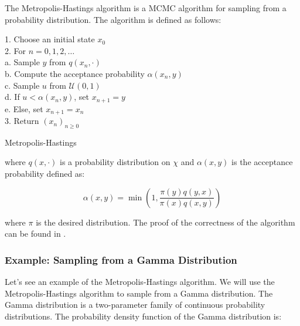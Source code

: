 \documentclass{report}
\begin{document}
The Metropolis-Hastings algorithm is a MCMC algorithm for sampling from a probability distribution. The algorithm is defined as follows:

\begin{center}
	\begin{minipage}{0.7\linewidth} %
		\begin{algorithm}[H]
			1. Choose an initial state $x_0$ \\
			2. For $n = 0, 1, 2, \dots$ \\
			\hspace*{0.5cm} a. Sample $y$ from $q(x_n, \cdot)$ \\
			\hspace*{0.5cm} b. Compute the acceptance probability $\alpha(x_n, y)$ \\
			\hspace*{0.5cm} c. Sample $u$ from $\mathcal{U}(0,1)$ \\
			\hspace*{0.5cm} d. If $u < \alpha(x_n, y)$, set $x_{n+1} = y$ \\
			\hspace*{0.5cm} e. Else, set $x_{n+1} = x_n$ \\
			3. Return $(x_n)_{n \geq 0}$
			\caption{Metropolis-Hastings} %
			\label{alg:Metropolis-Hastings}   %
		\end{algorithm}
	\end{minipage}
\end{center}

where $q(x, \cdot)$ is a probability distribution on $\chi$ and $\alpha(x,y)$ is the acceptance probability defined as:

\[
	\alpha(x,y) = \min \left(1, \frac{\pi(y) q(y,x)}{\pi(x) q(x,y)} \right)
\]

where $\pi$ is the desired distribution. The proof of the correctness of the algorithm can be found in \cite{wiki:metropolishastings}.

\subsubsection{Example: Sampling from a Gamma Distribution}
\label{sec:gamma_distribution_sampling}

Let's see an example of the Metropolis-Hastings algorithm. We will use the Metropolis-Hastings algorithm to sample from a Gamma distribution. The Gamma distribution is a two-parameter family of continuous probability distributions. The probability density function of the Gamma distribution is:
\end{document}

